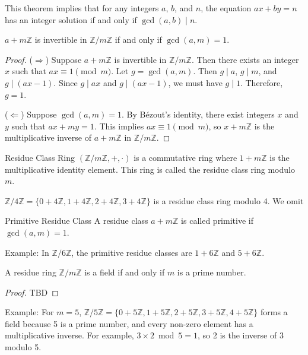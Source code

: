 \documentclass{article}
\begin{document}
This theorem implies that for any integers $a$, $b$, and $n$, the equation $ax + by = n$ has an integer solution if and only if $\gcd(a,b) \mid n$.

\begin{theorem}{}{}
$a + m\mathbb{Z}$ is invertible in $\mathbb{Z}/m\mathbb{Z}$ if and only if $\gcd(a,m) = 1$.
\end{theorem}

\begin{proof}
($\Rightarrow$) Suppose $a + m\mathbb{Z}$ is invertible in $\mathbb{Z}/m\mathbb{Z}$. Then there exists an integer $x$ such that $ax \equiv 1 \pmod{m}$. Let $g = \gcd(a,m)$. Then $g \mid a$, $g \mid m$, and $g \mid (ax - 1)$. Since $g \mid ax$ and $g \mid (ax - 1)$, we must have $g \mid 1$. Therefore, $g = 1$.

($\Leftarrow$) Suppose $\gcd(a,m) = 1$. By Bézout's identity, there exist integers $x$ and $y$ such that $ax + my = 1$. This implies $ax \equiv 1 \pmod{m}$, so $x + m\mathbb{Z}$ is the multiplicative inverse of $a + m\mathbb{Z}$ in $\mathbb{Z}/m\mathbb{Z}$.
\end{proof}

\begin{definition}{Residue Class Ring}{}
$(\mathbb{Z} / m \mathbb{Z}, +, \cdot)$ is a commutative ring where $1 + m \mathbb{Z}$ is the multiplicative identity element. This ring is called the residue class ring modulo $m$.
\end{definition}

$\mathbb{Z}/4\mathbb{Z} = \{0 + 4\mathbb{Z}, 1 + 4\mathbb{Z}, 2 + 4\mathbb{Z}, 3 + 4\mathbb{Z}\}$ is a residue class ring modulo 4. We omit 

\begin{definition}{Primitive Residue Class}{}
A residue class $a + m\mathbb{Z}$ is called primitive if $\gcd(a, m) = 1$.
\end{definition}

Example: In $\mathbb{Z}/6\mathbb{Z}$, the primitive residue classes are $1 + 6\mathbb{Z}$ and $5 + 6\mathbb{Z}$.

\begin{theorem}{}{}
A residue ring $\mathbb{Z} / m\mathbb{Z}$ is a field if and only if $m$ is a prime number.
\end{theorem}

\begin{proof}
    TBD
\end{proof}

Example: For $m = 5$, $\mathbb{Z}/5\mathbb{Z} = \{0 + 5\mathbb{Z}, 1 + 5\mathbb{Z}, 2 + 5\mathbb{Z}, 3 + 5\mathbb{Z}, 4 + 5\mathbb{Z}\}$ forms a field because 5 is a prime number, and every non-zero element has a multiplicative inverse. For example, $3 \times 2 \bmod 5 = 1$, so 2 is the inverse of 3 modulo 5.
\end{document}
